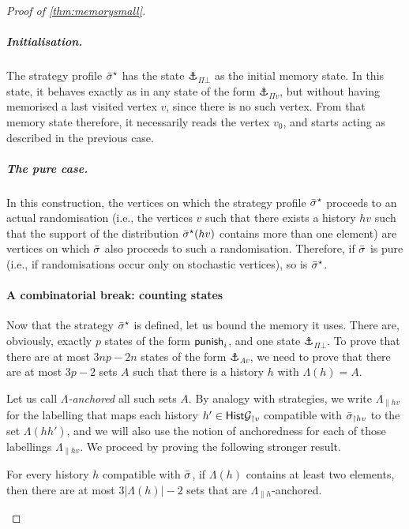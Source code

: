 \begin{proof}[Proof of \cref{thm:memorysmall}]
\subparagraph*{Initialisation.}
    The strategy profile ${\bar{\sigma}}^\star$  has the state $\anchor_{\Pi\bot}$ as the initial memory state.
    In this state, it behaves exactly as in any state of the form $\anchor_{\Pi v}$, but without having memorised a last visited vertex $v$, since there is no such vertex.
    From that memory state therefore, it necessarily reads the vertex $v_0$, and starts acting as described in the previous case.


\subparagraph*{The pure case.}
In this construction, the vertices on which the strategy profile ${\bar{\sigma}}^\star$ proceeds to an actual randomisation (i.e., the vertices $v$ such that there exists a history $hv$ such that the support of the distribution ${\bar{\sigma}}^\star(hv)$ contains more than one element) are vertices on which ${\bar{\sigma}}$ also proceeds to such a randomisation.
Therefore, if ${\bar{\sigma}}$ is pure (i.e., if randomisations occur only on stochastic vertices), so is ${\bar{\sigma}}^\star$.





\paragraph*{A combinatorial break: counting states}

    Now that the strategy ${\bar{\sigma}}^\star$ is defined, let us bound the memory it uses.
    There are, obviously, exactly $p$ states of the form $\mathsf{punish}_i$, and one state $\anchor_{\Pi\bot}$.
    To prove that there are at most $3np-2n$ states of the form $\anchor_{Av}$, we need to prove that there are at most $3p-2$ sets $A$ such that there is a history $h$ with $\Lambda(h) = A$.

    Let us call \emph{$\Lambda$-anchored} all such sets $A$.
    By analogy with strategies, we write $\Lambda_{\|hv}$ for the labelling that maps each history $h' \in \mathsf{Hist}\mathcal{G}_{\upharpoonright v}$ compatible with ${\bar{\sigma}}_{\upharpoonright hv}$ to the set $\Lambda(hh')$, and we will also use the notion of anchoredness for each of those labellings $\Lambda_{\|hv}$.
    We proceed by proving the following stronger result.
    
    \begin{proposition}\label{prop:combinatorial}
        For every history $h$ compatible with ${\bar{\sigma}}$, if $\Lambda(h)$ contains at least two elements, then there are at most $3|\Lambda(h)|-2$ sets that are $\Lambda_{\|h}$-anchored.
    \end{proposition}
    



\end{proof}
